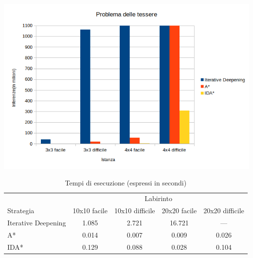\documentclass[a4paper,oneside,12pt]{book}
\begin{document}
\begin{center}
		\includegraphics[height=0.65\textwidth]{tessereInferenze}

		\restoregeometry
		\newpage
		\restoregeometry
	\end{center}

	\begin{table}
		\centering
		\begin{tabular}{l c c c c}
			\toprule %
			& \multicolumn{4}{c}{Labirinto} \\ %
			\cmidrule(l){2-5} %
			Strategia & 10x10 facile & 10x10 difficile & 20x20 facile & 20x20 difficile\\ %
			\midrule %
			Iterative Deepening & 1.085 & 2.721 & 16.721 & --- \\ %
			A* & 0.014 & 0.007 & 0.009 & 0.026\\ %
			IDA* & 0.129 & 0.088 & 0.028 & 0.104 \\ %

			\bottomrule
		\end{tabular}
		\caption{Tempi di esecuzione (espressi in secondi)}
	\end{table}
\end{document}
